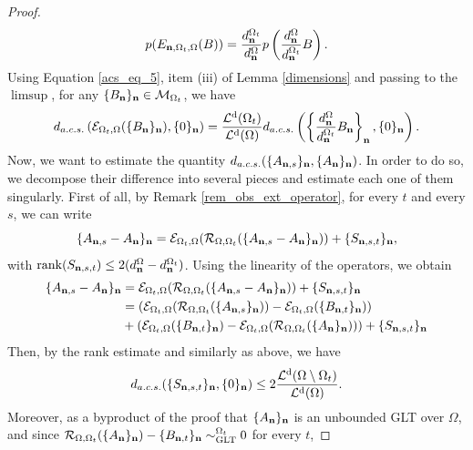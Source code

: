 \documentclass[10pt,a4paper]{amsart}
\DeclareMathOperator{\Ld}{\mathcal{L}^d}
\begin{document}
\begin{proof}
   \begin{equation}\label{acs_eq_5}
       p(E_{\bfn,\Omega_t,\Omega}(B))=\frac{d_\bfn^{\Omega_t}}{d_\bfn^{\Omega}}p\left(\frac{d_\bfn^{\Omega}}{d_\bfn^{\Omega_t}}B\right).
   \end{equation}
   Using Equation \eqref{acs_eq_5}, item (iii) of Lemma \ref{dimensions} and passing to the $\limsup$, for any $\{B_\mathbf n\}_\mathbf n\in\mathcal{M}_{\Omega_t}$, we have
   \begin{equation}\label{acs_eq_6}
       d_{a.c.s.}\left(\mathcal{E}_{\Omega_t,\Omega}(\{B_\bfn\}_\bfn),\{0\}_\bfn\right)=\frac{\Ld(\Omega_t)}{\Ld(\Omega)}d_{a.c.s.}\left(\left\{\frac{d_\bfn^{\Omega}}{d_\bfn^{\Omega_t}}B_\bfn\right\}_\bfn,\{0\}_\bfn\right).
   \end{equation}
   Now, we want to estimate the quantity $d_{a.c.s.}(\{A_{\mathbf n,s}\}_\mathbf n,\{A_{\mathbf n}\}_\mathbf n)$. In order to do so, we decompose their difference into several pieces and estimate each one of them singularly. First of all, by Remark \ref{rem_obs_ext_operator}, for every $t$ and every $s$, we can write
   \begin{equation*}
       \{A_{\mathbf n,s}-A_\mathbf n\}_\mathbf n =\mathcal{E}_{\Omega_t,\Omega}(\mathcal{R}_{\Omega,\Omega_t}(\{A_{\mathbf n,s}-A_\mathbf n\}_\mathbf n))+\{S_{\mathbf n,s,t}\}_\mathbf n,
   \end{equation*}
   with $\mathrm{rank}(S_{\mathbf n,s,t})\leq 2(d_\mathbf n^{\Omega}-d_\mathbf n^{\Omega_t})$. Using the linearity of the operators, we obtain 
   \begin{align}\label{acs_eq_extra}
       \{A_{\bfn,s}-A_\bfn\}_\bfn &=\mathcal{E}_{\Omega_t,\Omega}(\mathcal{R}_{\Omega,\Omega_t}(\{A_{\bfn,s}-A_\bfn\}_\bfn))+\{S_{\bfn,s,t}\}_\bfn\\
       \nonumber&=\left(\mathcal{E}_{\Omega_t,\Omega}(\mathcal{R}_{\Omega,\Omega_t}(\{A_{\bfn,s}\}_\bfn))-\mathcal{E}_{\Omega_t,\Omega}(\{B_{\bfn,t}\}_\bfn)\right)\\
       \nonumber&+\left(\mathcal{E}_{\Omega_t,\Omega}(\{B_{\bfn,t}\}_\bfn)-\mathcal{E}_{\Omega_t,\Omega}(\mathcal{R}_{\Omega,\Omega_t}(\{A_{\bfn}\}_\bfn))\right)+\{S_{\bfn,s,t}\}_\bfn\\
   \end{align}
   Then, by the rank estimate and similarly as above, we have
   \begin{equation}\label{acs_eq_7}
       d_{a.c.s.}(\{S_{\bfn,s,t}\}_\bfn,\{0\}_\bfn)\leq 2\frac{\Ld(\Omega\setminus\Omega_t)}{\Ld(\Omega)}.
   \end{equation}
   Moreover, as a byproduct of the proof that $\{A_\mathbf n\}_\mathbf n$ is an unbounded GLT over $\Omega$, and since $\mathcal{R}_{\Omega,\Omega_t}(\{A_\mathbf n\}_\mathbf n)-\{B_{\mathbf n,t}\}_\mathbf n\sim_{\mathrm{GLT}}^{\Omega_t}0$ for every $t$,

\end{proof}
\end{document}
